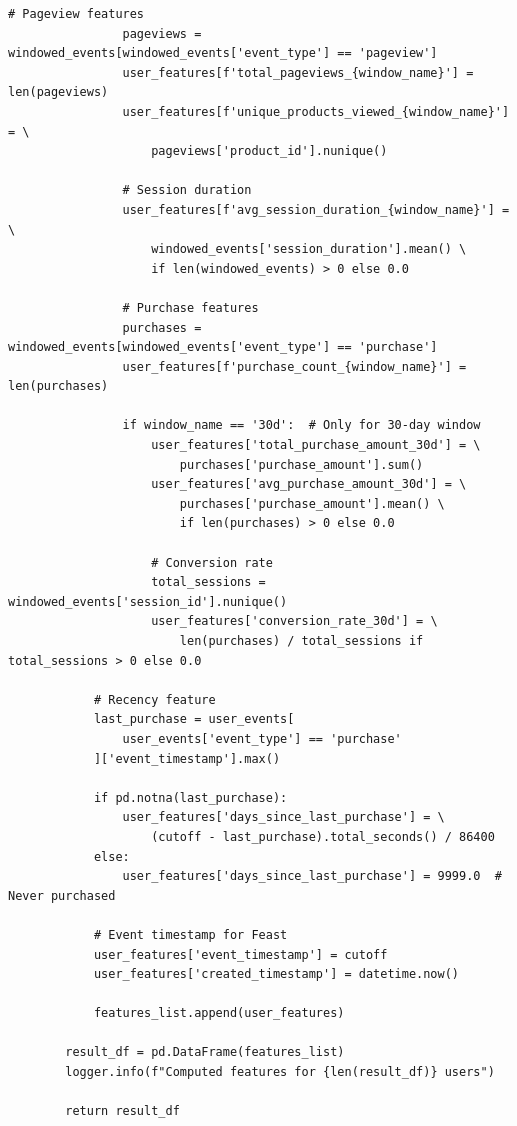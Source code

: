 \begin{lstlisting}[style=python, caption=Production feature materialization pipeline]
                # Pageview features
                pageviews = windowed_events[windowed_events['event_type'] == 'pageview']
                user_features[f'total_pageviews_{window_name}'] = len(pageviews)
                user_features[f'unique_products_viewed_{window_name}'] = \
                    pageviews['product_id'].nunique()

                # Session duration
                user_features[f'avg_session_duration_{window_name}'] = \
                    windowed_events['session_duration'].mean() \
                    if len(windowed_events) > 0 else 0.0

                # Purchase features
                purchases = windowed_events[windowed_events['event_type'] == 'purchase']
                user_features[f'purchase_count_{window_name}'] = len(purchases)

                if window_name == '30d':  # Only for 30-day window
                    user_features['total_purchase_amount_30d'] = \
                        purchases['purchase_amount'].sum()
                    user_features['avg_purchase_amount_30d'] = \
                        purchases['purchase_amount'].mean() \
                        if len(purchases) > 0 else 0.0

                    # Conversion rate
                    total_sessions = windowed_events['session_id'].nunique()
                    user_features['conversion_rate_30d'] = \
                        len(purchases) / total_sessions if total_sessions > 0 else 0.0

            # Recency feature
            last_purchase = user_events[
                user_events['event_type'] == 'purchase'
            ]['event_timestamp'].max()

            if pd.notna(last_purchase):
                user_features['days_since_last_purchase'] = \
                    (cutoff - last_purchase).total_seconds() / 86400
            else:
                user_features['days_since_last_purchase'] = 9999.0  # Never purchased

            # Event timestamp for Feast
            user_features['event_timestamp'] = cutoff
            user_features['created_timestamp'] = datetime.now()

            features_list.append(user_features)

        result_df = pd.DataFrame(features_list)
        logger.info(f"Computed features for {len(result_df)} users")

        return result_df


\end{lstlisting}

